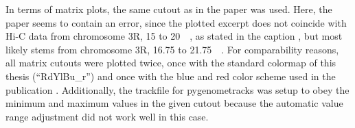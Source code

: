 In terms of matrix plots, the same cutout as in the paper \cite{Farre2018a} was used.
Here, the paper seems to contain an error, since the plotted excerpt does not coincide with Hi-C data from chromosome 3R, 15 to \SI{20}{\mega\bp}, as stated in the caption \cite[fig.~2]{Farre2018a},
but most likely stems from chromosome 3R, 16.75 to \SI{21.75}{\mega\bp}.
For comparability reasons, all matrix cutouts were plotted twice, once with the standard colormap of this thesis (``RdYlBu\_r'') and once
with the blue and red color scheme used in the publication \cite{Farre2018a}.
Additionally, the trackfile for pygenometracks was setup to obey the minimum and maximum values in the given cutout
because the automatic value range adjustment did not work well in this case.



\clearpage
